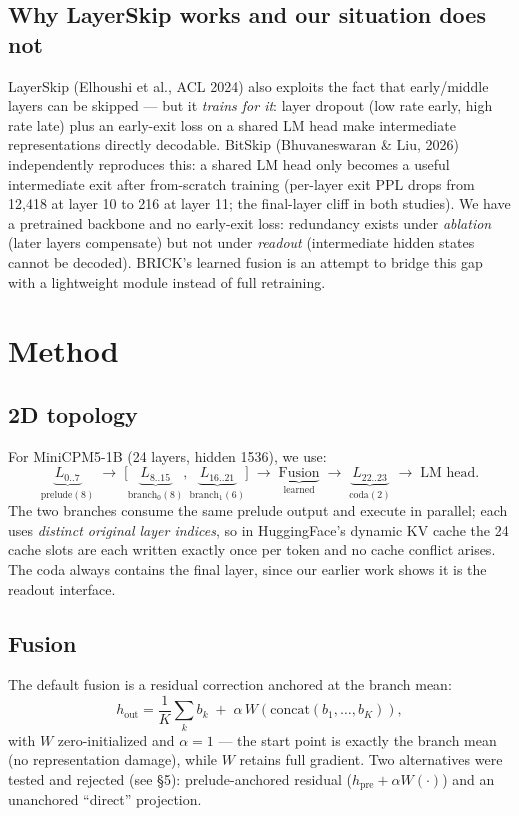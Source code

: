 \documentclass[11pt,a4paper]{article}
\begin{document}
\subsection{Why LayerSkip works and our situation does not}
LayerSkip (Elhoushi et al., ACL 2024) also exploits the fact that early/middle layers can be
skipped --- but it \emph{trains for it}: layer dropout (low rate early, high rate late)
plus an early-exit loss on a shared LM head make intermediate representations directly
decodable. BitSkip (Bhuvaneswaran \& Liu, 2026) independently reproduces this: a shared LM head
only becomes a useful intermediate exit after from-scratch training (per-layer exit PPL
drops from 12,418 at layer 10 to 216 at layer 11; the final-layer cliff in both studies).
We have a pretrained backbone and no early-exit loss: redundancy exists under
\emph{ablation} (later layers compensate) but not under \emph{readout} (intermediate
hidden states cannot be decoded). BRICK's learned fusion is an attempt to bridge this
gap with a lightweight module instead of full retraining.

\section{Method}

\subsection{2D topology}
For MiniCPM5-1B (24 layers, hidden 1536), we use:
\[
  \underbrace{L_{0..7}}_{\text{prelude}(8)}
  \;\longrightarrow\;
  \Big[\underbrace{L_{8..15}}_{\text{branch}_0(8)},
       \underbrace{L_{16..21}}_{\text{branch}_1(6)}\Big]
  \;\longrightarrow\;
  \underbrace{\text{Fusion}}_{\text{learned}}
  \;\longrightarrow\;
  \underbrace{L_{22..23}}_{\text{coda}(2)}
  \;\longrightarrow\;
  \text{LM head}.
\]
The two branches consume the same prelude output and execute in parallel; each uses
\emph{distinct original layer indices}, so in HuggingFace's dynamic KV cache the 24
cache slots are each written exactly once per token and no cache conflict arises.
The coda always contains the final layer, since our earlier work shows it is the
readout interface.

\subsection{Fusion}
The default fusion is a residual correction anchored at the branch mean:
\[
  h_{\text{out}} = \frac{1}{K}\sum_k b_k \;+\; \alpha\, W\!\left(\mathrm{concat}(b_1,\ldots,b_K)\right),
\]
with $W$ zero-initialized and $\alpha=1$ --- the start point is exactly the branch
mean (no representation damage), while $W$ retains full gradient. Two alternatives
were tested and rejected (see \S5): prelude-anchored residual
($h_{\text{pre}}+\alpha W(\cdot)$) and an unanchored ``direct'' projection.
\end{document}
